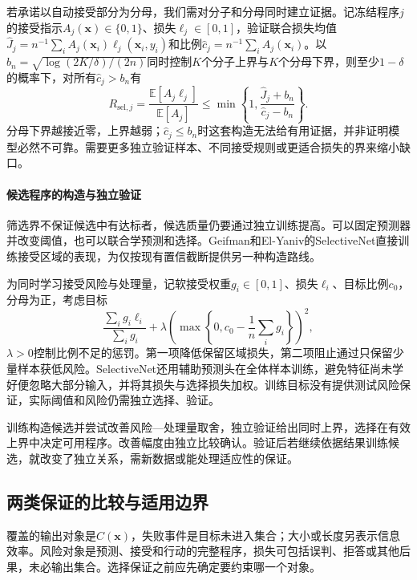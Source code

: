 若承诺以自动接受部分为分母，我们需对分子和分母同时建立证据。记冻结程序$j$的接受指示$A_j(\bm{x})\in\{0,1\}$、损失$\ell_j\in[0,1]$，验证联合损失均值$\hat J_j=n^{-1}\sum_i A_j(\bm{x}_i)\ell_j(\bm{x}_i,y_i)$和比例$\hat c_j=n^{-1}\sum_i A_j(\bm{x}_i)$。以$b_n=\sqrt{\log(2K/\delta)/(2n)}$同时控制$K$个分子上界与$K$个分母下界，则至少$1-\delta$的概率下，对所有$\hat c_j>b_n$有
\begin{equation}
 R_{\mathrm{sel},j}
 =\frac{\mathbb E[A_j\ell_j]}{\mathbb E[A_j]}
 \leq\min\left\{1,\frac{\hat J_j+b_n}{\hat c_j-b_n}\right\}.
 \label{eq:reliability-conditional-risk-bound}
\end{equation}
分母下界越接近零，上界越弱；$\hat c_j\leq b_n$时这套构造无法给有用证据，并非证明模型必然不可靠。需要更多独立验证样本、不同接受规则或更适合损失的界来缩小缺口。

\paragraph{候选程序的构造与独立验证}

筛选界不保证候选中有达标者，候选质量仍要通过独立训练提高。可以固定预测器并改变阈值，也可以联合学预测和选择。Geifman和El-Yaniv的SelectiveNet直接训练接受区域的表现，为仅按现有置信截断提供另一种构造路线。

为同时学习接受风险与处理量，记软接受权重$g_i\in[0,1]$、损失$\ell_i$、目标比例$c_0$，分母为正，考虑目标
\begin{equation}
 \frac{\sum_i g_i\ell_i}{\sum_i g_i}
 +\lambda\left(\max\left\{0,c_0-\frac1n\sum_i g_i\right\}\right)^2,
 \label{eq:reliability-selective-training}
\end{equation}
$\lambda>0$控制比例不足的惩罚。第一项降低保留区域损失，第二项阻止通过只保留少量样本获低风险。SelectiveNet还用辅助预测头在全体样本训练，避免特征尚未学好便忽略大部分输入，并将其损失与选择损失加权。训练目标没有提供测试风险保证，实际阈值和风险仍需独立选择、验证。

训练构造候选并尝试改善风险—处理量取舍，独立验证给出同时上界，选择在有效上界中决定可用程序。改善幅度由独立比较确认。验证后若继续依据结果训练候选，就改变了独立关系，需新数据或能处理适应性的保证。

\subsection{两类保证的比较与适用边界}

覆盖的输出对象是$C(\bm{x})$，失败事件是目标未进入集合；大小或长度另表示信息效率。风险对象是预测、接受和行动的完整程序，损失可包括误判、拒答或其他后果，未必输出集合。选择保证之前应先确定要约束哪一个对象。

